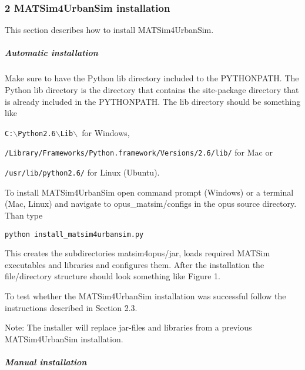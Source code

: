\documentclass[a4paper,11pt]{report}
\begin{document}
\subsubsection{2 MATSim4UrbanSim installation}

This section describes how to install MATSim4UrbanSim.

\subparagraph{Automatic installation}

Make sure to have the Python lib directory included to the  PYTHONPATH. The Python lib directory is the directory that contains the  site-package directory that is already included in the PYTHONPATH. The  lib directory should be something like


\texttt{C:$\backslash$Python2.6$\backslash$Lib$\backslash$ }for Windows,


\texttt{/Library/Frameworks/Python.framework/Versions/2.6/lib/} for Mac or


\texttt{/usr/lib/python2.6/} for Linux (Ubuntu).

To install MATSim4UrbanSim open command prompt (Windows) or a  terminal (Mac, Linux) and navigate to opus\_matsim/configs in the opus  source directory. Than type


\texttt{python install\_matsim4urbansim.py}

This creates the subdirectories matsim4opus/jar, loads required  MATSim executables and libraries and configures them. After the  installation the file/directory structure should look something like  Figure 1.

To test whether the MATSim4UrbanSim installation was successful follow the instructions described in Section 2.3.

Note: The installer will replace jar-files and libraries from a previous MATSim4UrbanSim installation.

\subparagraph{Manual installation}
\end{document}
